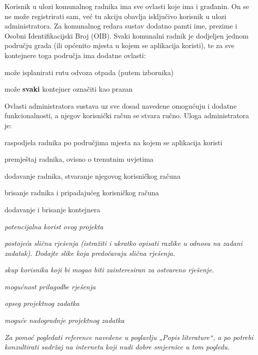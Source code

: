 		Korisnik u ulozi komunalnog radnika ima sve ovlasti koje ima i građanin. On se ne može registrirati sam, već tu akciju obavlja isključivo korisnik u ulozi administratora. Za komunalnog redara sustav dodatno pamti ime, prezime i Osobni Identifikacijski Broj (OIB). Svaki komunalni radnik je dodjeljen jednom području grada (ili općenito mjesta u kojem se aplikacija koristi), te za sve kontejnere toga područja ima dodatne ovlasti:
		\begin{packed_item}
			\item može isplanirati rutu odvoza otpada (putem izbornika)
			\item može \textbf{svaki} kontejner označiti kao prazan
		\end{packed_item}
		
		Ovlasti administratora sustava uz sve dosad navedene omogućuju i dodatne funkcionalnosti, a njegov korisnički račun se stvara ručno. Uloga administratora je:
		\begin{packed_item}
			\item raspodjela radnika po područjima mjesta na kojem se aplikacija koristi
			\item premještaj radnika, ovisno o trenutnim uvjetima
			\item dodavanje radnika, stvaranje njegovog korisničkog računa
			\item brisanje radnika i pripadajućeg korisničkog računa
			\item dodavanje i brisanje kontejnera
		\end{packed_item}
	
		
		\hline
		
		\begin{packed_item}
			\item \textit{potencijalna korist ovog projekta}
			\item \textit{postojeća slična rješenja (istražiti i ukratko opisati razlike u odnosu na zadani zadatak). Dodajte slike koja predočavaju slična rješenja.}
			\item \textit{skup korisnika koji bi mogao biti zainteresiran za ostvareno rješenje.}
			\item \textit{mogućnost prilagodbe rješenja }
			\item \textit{opseg projektnog zadatka}
			\item \textit{moguće nadogradnje projektnog zadatka}
		\end{packed_item}
		
		\textit{Za pomoć pogledati reference navedene u poglavlju „Popis literature“, a po potrebi konzultirati sadržaj na internetu koji nudi dobre smjernice u tom pogledu.}
		\eject
		

